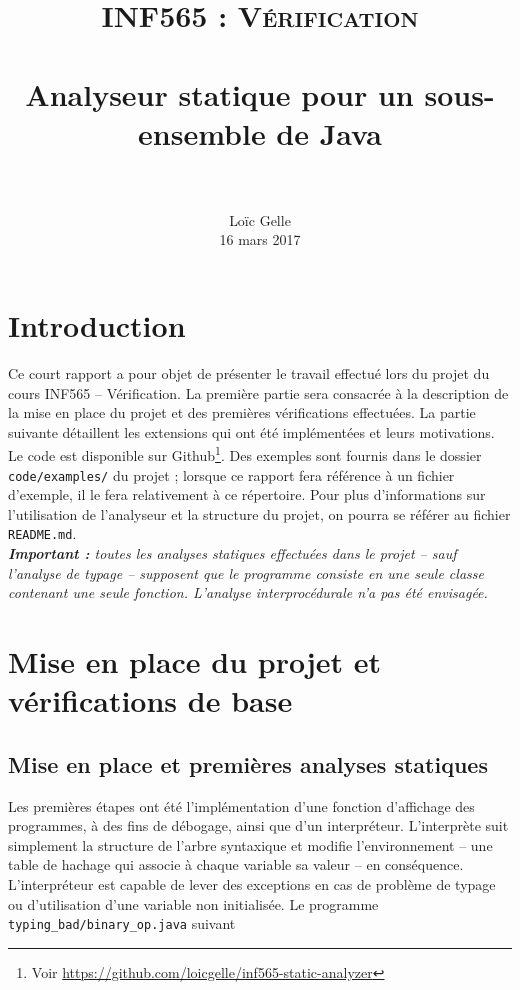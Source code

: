 \documentclass[paper=a4, fontsize=11pt]{scrartcl}
\title{	
		\usefont{OT1}{bch}{b}{n}
		\normalfont \normalsize \textsc{INF565 : Vérification} \\ [25pt]
		\horrule{0.5pt} \\[0.4cm]
		\huge Analyseur statique pour un sous-ensemble de Java \\
		\horrule{2pt} \\[0.5cm]
}
\author{
		\normalfont 								\normalsize
        Lo\"{i}c Gelle\\[-3pt]		\normalsize
        16 mars 2017
}
\date{}
\numberwithin{figure}{section}			%
\numberwithin{table}{section}				%
\begin{document}
\maketitle
\section{Introduction}

Ce court rapport a pour objet de présenter le travail effectué lors du projet du cours INF565 -- Vérification. La première partie sera consacrée à la description de la mise en place du projet et des premières vérifications effectuées. La partie suivante détaillent les extensions qui ont été implémentées et leurs motivations.\\

Le code est disponible sur Github\footnote{Voir \url{https://github.com/loicgelle/inf565-static-analyzer}}. Des exemples sont fournis dans le dossier \texttt{code/examples/} du projet ; lorsque ce rapport fera référence à un fichier d'exemple, il le fera relativement à ce répertoire. Pour plus d'informations sur l'utilisation de l'analyseur et la structure du projet, on pourra se référer au fichier \texttt{README.md}.\\

\textit{\textbf{Important :} toutes les analyses statiques effectuées dans le projet -- sauf l'analyse de typage -- supposent que le programme consiste en une seule classe contenant une seule fonction. L'analyse interprocédurale n'a pas été envisagée.}

\section{Mise en place du projet et vérifications de base}

\subsection{Mise en place et premières analyses statiques}

Les premières étapes ont été l'implémentation d'une fonction d'affichage des programmes, à des fins de débogage, ainsi que d'un interpréteur. L'interprète suit simplement la structure de l'arbre syntaxique et modifie l'environnement -- une table de hachage qui associe à chaque variable sa valeur -- en conséquence.\\

L'interpréteur est capable de lever des exceptions en cas de problème de typage ou d'utilisation d'une variable non initialisée. Le programme \texttt{typing\_bad/binary\_op.java} suivant
\end{document}
